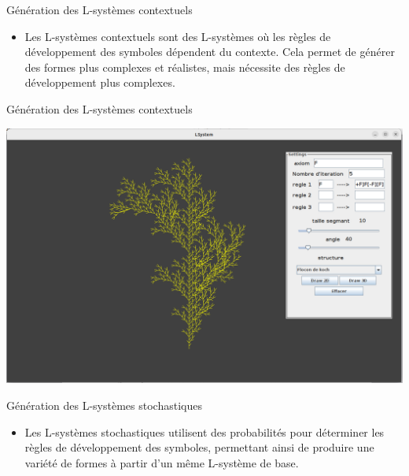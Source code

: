 
  \begin{frame}{Génération des L-systèmes contextuels}
      \begin{itemize}
             \item Les L-systèmes contextuels sont des L-systèmes où les règles de développement des symboles dépendent du contexte. Cela permet de générer des formes plus complexes et réalistes, mais nécessite des règles de développement plus complexes.
         \end{itemize}
    \end{frame}


     \begin{frame}{Génération des L-systèmes contextuels}
        \begin{center}
        \includegraphics[scale=0.2]{./images/capture3.png}
        
    \end{center}
    \end{frame} 
    
    \begin{frame}{Génération des L-systèmes stochastiques}
         \begin{itemize}
             \item Les L-systèmes stochastiques utilisent des probabilités pour déterminer les règles de développement des symboles, permettant ainsi de produire une variété de formes à partir d'un même L-système de base.
         \end{itemize}
         
    \end{frame}
    
